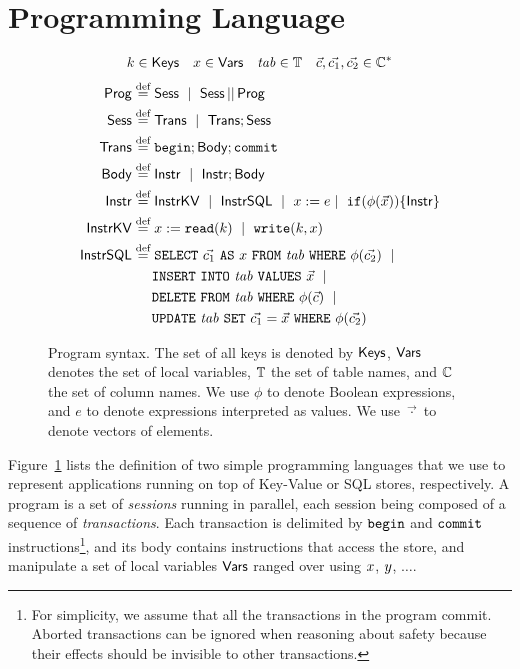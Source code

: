 
\section{Programming Language}

\begin{figure}
\small
\begin{align*}
k\in \mathsf{Keys}\quad {x}\in\mathsf{Vars}\quad \mathit{tab}\in\mathbb{T}\quad \vec{c},\vec{c_1},\vec{c_2}\in \mathbb{C}^*
\end{align*}
\begin{align*}
\mathsf{Prog} &  \stackrel{\text{def}}{=}  \mathsf{Sess} \ \mid\  \mathsf{Sess}\,||\,\mathsf{Prog} \\
\mathsf{Sess} & \stackrel{\text{def}}{=}  \mathsf{Trans} \ \mid\  \mathsf{Trans}; \mathsf{Sess} \\
\mathsf{Trans} & \stackrel{\text{def}}{=}  \mathtt{begin}; \mathsf{Body}; \mathtt{commit} \\
\mathsf{Body} & \stackrel{\text{def}}{=}  \mathsf{Instr} \ \mid\  \mathsf{Instr}; \mathsf{Body} \\
\mathsf{Instr} & \stackrel{\text{def}}{=}  \mathsf{InstrKV} \ \mid\  \mathsf{InstrSQL}\ \mid\  x := e \mid\ \mathtt{if}({\phi(\vec{x})}) \{ {\mathsf{Instr}} \} \\
\mathsf{InstrKV} & \stackrel{\text{def}}{=} {x} := \mathtt{read}(k)  \ \mid\  \mathtt{write}(k,{x}) \\
\mathsf{InstrSQL} & \stackrel{\text{def}}{=}  \mathtt{SELECT}\ {\vec{c_1}}\ \mathtt{AS}\ {{x}}\ \mathtt{FROM}\ {\mathit{tab}}\ \mathtt{WHERE}\ {\phi(\vec{c_2})} \ \mid\ \\
& \hspace{5mm} \mathtt{INSERT\ INTO}\ {\mathit{tab}}\ \mathtt{VALUES}\ {\vec{x}} \ \mid\ \\
& \hspace{5mm} \mathtt{DELETE\ FROM}\ {\mathit{tab}}\ \mathtt{WHERE}\ {\phi(\vec{c})} \ \mid\ \\
& \hspace{5mm} \mathtt{UPDATE}\ {\mathit{tab}}\ \mathtt{SET}\ {\vec{c_1}=\vec{x}}\ \mathtt{WHERE}\ {\phi(\vec{c_2})} 
\end{align*}
\vspace{-6mm}
\caption{Program syntax. The set of all keys is denoted by $\mathsf{Keys}$, $\mathsf{Vars}$ denotes the set of local variables, $\mathbb{T}$ the set of table names, and $\mathbb{C}$ the set of column names.
We use $\phi$ to denote Boolean expressions, and $e$ to denote expressions interpreted as values. We use $\vec{\cdot}$ to denote vectors of elements.}
\label{fig:syntax}
\vspace{-4mm}
\end{figure}

Figure~\ref{fig:syntax} lists the definition of two simple programming languages that we use to represent applications running on top of Key-Value or SQL stores, respectively. A program is a set of \emph{sessions} running in parallel, each session being composed of a sequence of \emph{transactions}. Each transaction is delimited by $\mathtt{begin}$ and $\mathtt{commit}$ instructions\footnote{For simplicity, we assume that all the transactions in the program commit. Aborted transactions can be ignored when reasoning about safety because their effects should be invisible to other transactions.}, and its body contains instructions that access the store, and manipulate a set of local variables $\mathsf{Vars}$ ranged over using ${x}$, ${y}$, $\ldots$.

